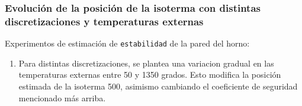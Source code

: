 \subsubsection{Evolución de la posición de la isoterma con distintas discretizaciones y temperaturas externas}
Experimentos de estimación de \texttt{estabilidad} de la pared del horno:
\begin{enumerate}
    \item Para distintas discretizaciones, se plantea una variacion gradual en las temperaturas externas entre 50 y 1350 grados. Esto modifica la posición estimada de la isoterma 500, asimismo cambiando el coeficiente de seguridad mencionado más arriba.
\end{enumerate}